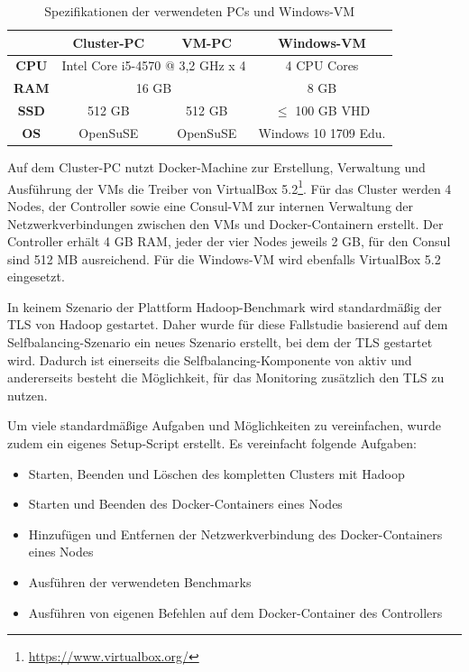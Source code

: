 \begin{table}
    \centering
    \begin{tabular}{|c|c|c|c|}
    	\hline
    	 \textbf{}   & \textbf{Cluster-PC} &         \textbf{VM-PC}          & \textbf{Windows-VM}  \\ \hline\hline
    	\textbf{CPU} & \multicolumn{2}{c|}{Intel Core i5-4570 @ 3,2 GHz x 4} &     4 CPU Cores      \\ \hline
    	\textbf{RAM} &              \multicolumn{2}{c|}{16 GB}               &         8 GB         \\ \hline
    	\textbf{SSD} &       512 GB        &             512 GB              &  $\leq$ 100 GB VHD   \\ \hline
    	\textbf{OS}  &      OpenSuSE       &            OpenSuSE             & Windows 10 1709 Edu. \\ \hline
    \end{tabular}
    \caption{Spezifikationen der verwendeten PCs und Windows-VM}
    \label{tab:pcSpecs}
\end{table}

Auf dem Cluster-PC nutzt Docker-Machine zur Erstellung, Verwaltung und Ausführung der VMs die Treiber von VirtualBox 5.2\footnote{\url{https://www.virtualbox.org/}}. Für das Cluster werden 4 Nodes, der Controller sowie eine Consul-VM zur internen Verwaltung der Netzwerkverbindungen zwischen den VMs und Docker-Containern erstellt. Der Controller erhält 4 GB RAM, jeder der vier Nodes jeweils 2 GB, für den Consul sind 512 MB ausreichend. Für die Windows-VM wird ebenfalls VirtualBox 5.2 eingesetzt.

In keinem Szenario der Plattform Hadoop-Benchmark wird standardmäßig der \ac{TLS} von Hadoop gestartet. Daher wurde für diese Fallstudie basierend auf dem Selfbalancing-Szenario ein neues Szenario erstellt, bei dem der \ac{TLS} gestartet wird. Dadurch ist einerseits die Selfbalancing-Komponente von \citeauthor{zhang2016} aktiv und andererseits besteht die Möglichkeit, für das Monitoring zusätzlich den \ac{TLS} zu nutzen.

Um viele standardmäßige Aufgaben und Möglichkeiten zu vereinfachen, wurde zudem ein eigenes Setup-Script erstellt. Es vereinfacht folgende Aufgaben:

\begin{itemize}[noitemsep]
    \item Starten, Beenden und Löschen des kompletten Clusters mit Hadoop
    \item Starten und Beenden des Docker-Containers eines Nodes
    \item Hinzufügen und Entfernen der Netzwerkverbindung des Docker-Containers eines Nodes
    \item Ausführen der verwendeten Benchmarks
    \item Ausführen von eigenen Befehlen auf dem Docker-Container des Controllers
\end{itemize}

